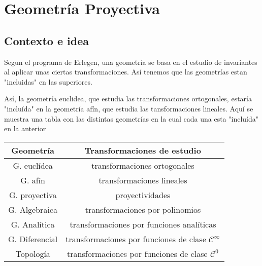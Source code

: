 \chapter{Geometría Proyectiva}
\section{Contexto e idea}
Segun el programa de Erlegen, una geometría se basa en el estudio de invariantes
al aplicar unas ciertas transformaciones. Así tenemos que las geometrías estan
"incluidas" en las superiores.

Así, la geometría euclidea, que estudia las transformaciones ortogonales, estaría
"incluída" en la geometría afín, que estudia las tansformaciones lineales. Aquí
se muestra una tabla con las distintas geometrías en la cual cada una esta
"incluída" en la anterior
\begin{center}
    \begin{tabular}{|c|c|}
        \hline Geometría & Transformaciones de estudio \\
        \hline \hline
        G. euclídea  & transformaciones ortogonales \\ \hline
        G. afín & transformaciones lineales \\ \hline
        G. proyectiva & proyectividades \\ \hline
        G. Algebraica & transformaciones por polinomios \\ \hline
        G. Analítica & transformaciones por funciones analíticas \\ \hline
        G. Diferencial & transformaciones por funciones de clase
        $\mathcal{C}^\infty$ \\ \hline
        Topología & transformaciones por funciones de clase $\mathcal{C}^0$\\ \hline
    \end{tabular}
\end{center}

